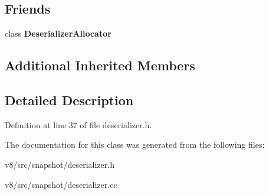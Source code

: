 \subsection*{Friends}
\begin{DoxyCompactItemize}
\item 
\mbox{\label{classv8_1_1internal_1_1Deserializer_a235ef6d95e010ab42f7277082620cb0a}} 
class {\bfseries Deserializer\+Allocator}
\end{DoxyCompactItemize}
\subsection*{Additional Inherited Members}


\subsection{Detailed Description}


Definition at line 37 of file deserializer.\+h.



The documentation for this class was generated from the following files\+:\begin{DoxyCompactItemize}
\item 
v8/src/snapshot/deserializer.\+h\item 
v8/src/snapshot/deserializer.\+cc\end{DoxyCompactItemize}
